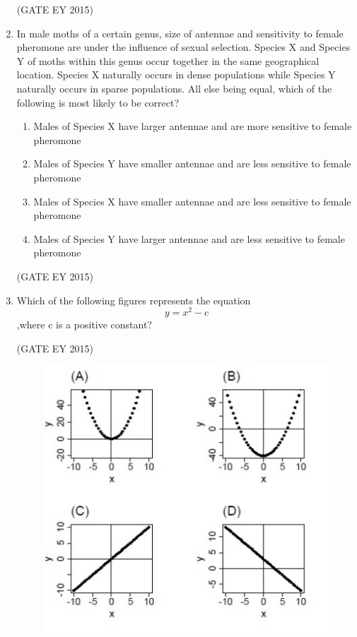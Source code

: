 \documentclass[journal,12pt,onecolumn]{IEEEtran}
\theoremstyle{remark}
\begin{document}
\begin{enumerate}
\begin{multicols}{2}
\begin{enumerate}
    \end{enumerate}
    \end{multicols}
\hfill{(GATE EY 2015)}




\item In male moths of a certain genus, size of antennae and sensitivity to female pheromone are under the influence of sexual selection. Species X and Species Y of moths within this genus occur together in the same geographical location. Species X naturally occurs in dense populations while Species Y naturally occurs in sparse populations. All else being equal, which of the following is most likely to be correct?



\begin{enumerate}
    
\item  Males of Species X have larger antennae and are more sensitive to female pheromone
\item Males of Species Y have smaller antennae and are less sensitive to female pheromone
\item Males of Species X have smaller antennae and are less sensitive to female pheromone
\item Males of Species Y have larger antennae and are less sensitive to female pheromone



    \end{enumerate}
  
\hfill{(GATE EY 2015)}





\item 
Which of the following figures represents the equation \[y =x^2-c\],where c is a positive constant?


\hfill{(GATE EY 2015)}

\begin{figure}[H]
    \centering
    \includegraphics[]{figs/O.40.png}
    \caption{}
    \label{fig:5}
\end{figure}


\end{enumerate}
\end{document}
